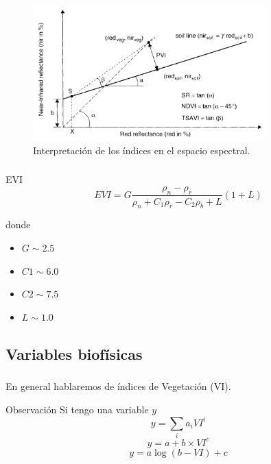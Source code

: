 \documentclass[handout]{beamer}
\begin{document}
\begin{frame}
    \frametitle{\subsecname}
    \begin{figure}
    \begin{center}
        \includegraphics[width=0.8\textwidth]{imagenes/int_graf.png}
    \end{center}
    \caption{Interpretación de los índices en el espacio espectral.}
    \end{figure}
\end{frame}

\begin{frame}
    \frametitle{\subsecname}
    \begin{block}{EVI}
        \begin{equation}
            EVI = G\frac{\rho_n - \rho_r}{\rho_n+C_1\rho_r-C_2\rho_b+L}(1+L) 
        \end{equation}
    \end{block}
    donde
    \begin{itemize}
        \item $G  \sim 2.5$
        \item $C1 \sim 6.0$
        \item $C2 \sim 7.5$
        \item $L  \sim 1.0$
    \end{itemize}
\end{frame}

\subsection{Variables biofísicas}

\begin{frame}
    \frametitle{\subsecname}
    En general hablaremos de índices de Vegetación (VI).\pause\
    \begin{block}{Observación}
        Si tengo una variable $y$\pause\
        \begin{equation}
            y = \sum_i a_i VI^i
        \end{equation}
        \begin{equation}
            y = a + b \times VI^c
        \end{equation}
        \begin{equation}
            y = a \log(b-VI)+c
        \end{equation}
    \end{block}
\end{frame}
\end{document}
